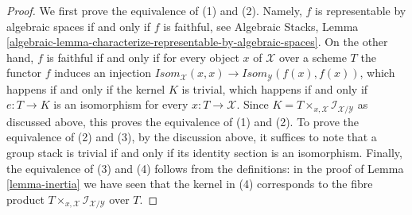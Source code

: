 \documentclass[10pt,a4paper]{amsart}
\theoremstyle{plain}
\theoremstyle{definition}
\theoremstyle{remark}
\numberwithin{equation}{subsection}
\begin{document}
\begin{proof}
We first prove the equivalence of (1) and (2).
Namely, $f$ is representable by algebraic spaces if and only if $f$ is
faithful, see
Algebraic Stacks,
Lemma \ref{algebraic-lemma-characterize-representable-by-algebraic-spaces}.
On the other hand, $f$ is faithful if and only if for every object $x$
of $\mathcal{X}$ over a scheme $T$ the functor $f$ induces an injection
$\mathit{Isom}_\mathcal{X}(x, x) \to
\mathit{Isom}_\mathcal{Y}(f(x), f(x))$,
which happens if and only if the kernel $K$ is trivial, which happens if and
only if $e : T \to K$ is an isomorphism for every $x : T \to \mathcal{X}$.
Since $K = T \times_{x, \mathcal{X}} \mathcal{I}_{\mathcal{X}/\mathcal{Y}}$
as discussed above, this proves the equivalence of (1) and (2). To prove
the equivalence of (2) and (3), by the discussion above, it suffices to
note that a group stack is trivial if and only if its identity section
is an isomorphism. Finally, the equivalence of (3) and (4) follows
from the definitions: in the proof of Lemma \ref{lemma-inertia}
we have seen that the kernel in (4) corresponds to the fibre product
$T \times_{x, \mathcal{X}} \mathcal{I}_{\mathcal{X}/\mathcal{Y}}$ over $T$.
\end{proof}
\end{document}
